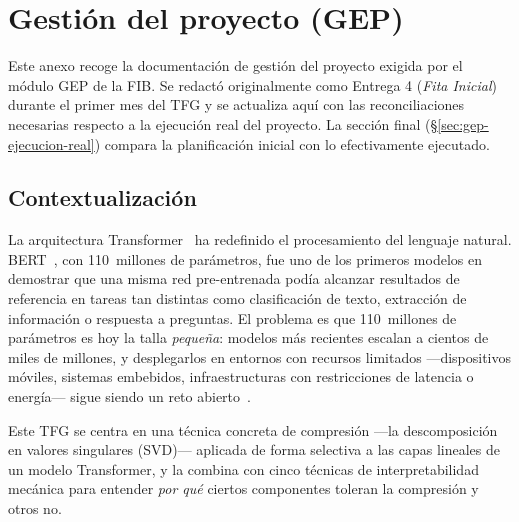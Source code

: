 
\section{Gestión del proyecto (GEP)}
\label{sec:gep}

Este anexo recoge la documentación de gestión del proyecto exigida por
el módulo GEP de la FIB. Se redactó originalmente como Entrega 4
(\textit{Fita Inicial}) durante el primer mes del TFG y se actualiza
aquí con las reconciliaciones necesarias respecto a la ejecución real
del proyecto. La sección final (\S\ref{sec:gep-ejecucion-real}) compara
la planificación inicial con lo efectivamente ejecutado.

\subsection{Contextualización}
\label{sec:gep-contexto}

La arquitectura Transformer~\cite{vaswani2017attention} ha redefinido el
procesamiento del lenguaje natural. BERT~\cite{devlin2019bert}, con
110~millones de parámetros, fue uno de los primeros modelos en demostrar
que una misma red pre-entrenada podía alcanzar resultados de referencia
en tareas tan distintas como clasificación de texto, extracción de
información o respuesta a preguntas. El problema es que 110~millones de
parámetros es hoy la talla \emph{pequeña}: modelos más recientes escalan
a cientos de miles de millones, y desplegarlos en entornos con recursos
limitados ---dispositivos móviles, sistemas embebidos, infraestructuras
con restricciones de latencia o energía--- sigue siendo un reto
abierto~\cite{strubell2019energy}.

Este TFG se centra en una técnica concreta de compresión ---la
descomposición en valores singulares (SVD)--- aplicada de forma
selectiva a las capas lineales de un modelo Transformer, y la combina
con cinco técnicas de interpretabilidad mecánica para entender
\emph{por qué} ciertos componentes toleran la compresión y otros no.

